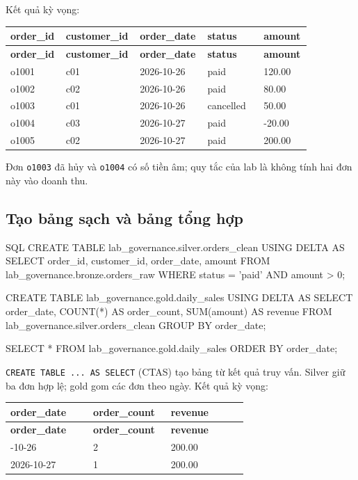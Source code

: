 Kết quả kỳ vọng:


\begingroup\small
\renewcommand{\arraystretch}{1.2}
\begin{longtable}{@{}p{0.16\linewidth}p{0.18\linewidth}p{0.2\linewidth}p{0.18\linewidth}p{0.14\linewidth}@{}}
\toprule
\rowcolor{rowLavender}
\textbf{order\_id} & \textbf{customer\_id} & \textbf{order\_date} & \textbf{status} & \textbf{amount} \\
\midrule
\endfirsthead
\toprule
\rowcolor{rowLavender}
\textbf{order\_id} & \textbf{customer\_id} & \textbf{order\_date} & \textbf{status} & \textbf{amount} \\
\midrule
\endhead
\bottomrule
\endfoot
o1001 & c01 & 2026-10-26 & paid & 120.00 \\
o1002 & c02 & 2026-10-26 & paid & 80.00 \\
o1003 & c01 & 2026-10-26 & cancelled & 50.00 \\
o1004 & c03 & 2026-10-27 & paid & -20.00 \\
o1005 & c02 & 2026-10-27 & paid & 200.00 \\
\end{longtable}
\endgroup

Đơn \texttt{o1003} đã hủy và \texttt{o1004} có số tiền âm; quy tắc của lab là không tính hai đơn này vào doanh thu.


\subsection{Tạo bảng sạch và bảng tổng hợp}

\begin{aivncodebox}[language={}]{SQL}
CREATE TABLE lab_governance.silver.orders_clean
USING DELTA AS
SELECT order_id, customer_id, order_date, amount
FROM lab_governance.bronze.orders_raw
WHERE status = 'paid'
  AND amount > 0;

CREATE TABLE lab_governance.gold.daily_sales
USING DELTA AS
SELECT order_date, COUNT(*) AS order_count, SUM(amount) AS revenue
FROM lab_governance.silver.orders_clean
GROUP BY order_date;

SELECT * FROM lab_governance.gold.daily_sales ORDER BY order_date;
\end{aivncodebox}

\texttt{CREATE TABLE .\allowbreak{}.\allowbreak{}.\allowbreak{} AS SELECT} (CTAS) tạo bảng từ kết quả truy vấn. Silver giữ ba đơn hợp lệ; gold gom các đơn theo ngày. Kết quả kỳ vọng:


\begingroup\small
\renewcommand{\arraystretch}{1.2}
\begin{longtable}{@{}p{0.32\linewidth}p{0.3\linewidth}p{0.3\linewidth}@{}}
\toprule
\rowcolor{rowLavender}
\textbf{order\_date} & \textbf{order\_count} & \textbf{revenue} \\
\midrule
\endfirsthead
\toprule
\rowcolor{rowLavender}
\textbf{order\_date} & \textbf{order\_count} & \textbf{revenue} \\
\midrule
\endhead
\bottomrule
\endfoot
2026-10-26 & 2 & 200.00 \\
2026-10-27 & 1 & 200.00 \\
\end{longtable}
\endgroup

